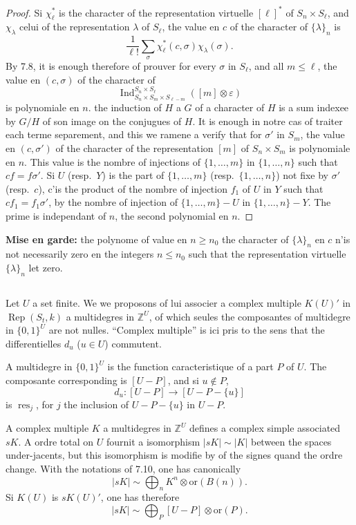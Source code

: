 \documentclass[11pt,a4paper]{article}
\theoremstyle{plain}
\theoremstyle{definition}
\DeclareMathOperator{\Ind}{Ind}
\DeclareMathOperator{\Rep}{Rep}
\DeclareMathOperator{\res}{res}
\newcommand{\Z}{\mathbb{Z}}
\newcommand{\eps}{\varepsilon}
\begin{document}
\begin{proof}
Si $\chi_\ell^*$ is the character of the representation virtuelle $[\ell]^*$ of $S_n \times S_\ell$, and $\chi_\lambda$ celui of the representation $\lambda$ of $S_\ell$, the value en $c$ of the character of $\{\lambda\}_n$ is
\[
\frac{1}{\ell!} \sum_\sigma \chi_\ell^*(c, \sigma) \chi_\lambda(\sigma).
\]
By 7.8, it is enough therefore of prouver for every $\sigma$ in $S_\ell$, and all $m \leq \ell$, the value en $(c, \sigma)$ of the character of
\[
\Ind_{S_n \times S_m \times S_{\ell-m}}^{S_n \times S_\ell}([m] \otimes \eps)
\]
is polynomiale en $n$. the induction of $H$ a $G$ of a character of $H$ is a sum indexee by $G/H$ of son image on the conjugues of $H$. It is enough in notre cas of traiter each terme separement, and this we ramene a verify that for $\sigma'$ in $S_m$, the value en $(c, \sigma')$ of the character of the representation $[m]$ of $S_n \times S_m$ is polynomiale en $n$. This value is the nombre of injections of $\{1, \ldots, m\}$ in $\{1, \ldots, n\}$ such that $cf = f\sigma'$. Si $U$ (resp.~$Y$) is the part of $\{1, \ldots, m\}$ (resp.~$\{1, \ldots, n\}$) not fixe by $\sigma'$ (resp.~$c$), c'is the product of the nombre of injection $f_1$ of $U$ in $Y$ such that $cf_1 = f_1\sigma'$, by the nombre of injection of $\{1, \ldots, m\} - U$ in $\{1, \ldots, n\} - Y$. The prime is independant of $n$, the second polynomial en $n$.
\end{proof}

\noindent\textbf{Mise en garde:} the polynome of value en $n \geq n_0$ the character of $\{\lambda\}_n$ en $c$ n'is not necessarily zero en the integers $n \leq n_0$ such that the representation virtuelle $\{\lambda\}_n$ let zero.

\subsection{}
Let $U$ a set finite. We we proposons of lui associer a complex multiple $K(U)'$ in $\Rep(S_t, k)$ a multidegres in $\Z^U$, of which seules the composantes of multidegre in $\{0,1\}^U$ are not nulles. ``Complex multiple'' is ici pris to the sens that the differentielles $d_u$ ($u \in U$) commutent.

A multidegre in $\{0,1\}^U$ is the function caracteristique of a part $P$ of $U$. The composante corresponding is $[U - P]$, and si $u \notin P$,
\[
d_u : [U - P] \to [U - P - \{u\}]
\]
is $\res_j$, for $j$ the inclusion of $U - P - \{u\}$ in $U - P$.

A complex multiple $K$ a multidegres in $\Z^U$ defines a complex simple associated $sK$. A ordre total on $U$ fournit a isomorphism $|sK| \sim |K|$ between the spaces under-jacents, but this isomorphism is modifie by of the signes quand the ordre change. With the notations of 7.10, one has canonically
\[
|sK| \sim \bigoplus_n K^n \otimes \text{or}(B(n)).
\]
Si $K(U)$ is $sK(U)'$, one has therefore
\[
|sK| \sim \bigoplus_P [U - P] \otimes \text{or}(P).
\]
\end{document}
